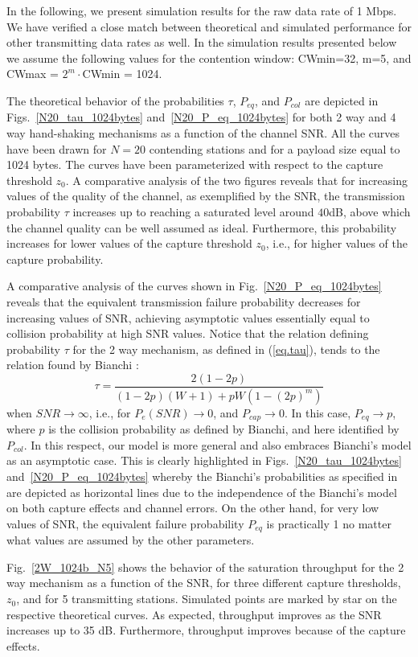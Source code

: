 \documentclass[10pt,onecolumn,a4paper]{IEEEtran}
\begin{document}
In the following, we present simulation results for the raw data
rate of 1 Mbps. We have verified a close match between theoretical
and simulated performance for other transmitting data rates as
well. In the simulation results presented below we assume the
following values for the contention window: CWmin=32, m=5, and
CWmax = $2^m\cdot$CWmin = 1024.

The theoretical behavior of the probabilities $\tau$, $P_{eq}$,
and $P_{col}$ are depicted in Figs.~\ref{N20_tau_1024bytes}
and~\ref{N20_P_eq_1024bytes} for both 2 way and 4 way hand-shaking
mechanisms as a function of the channel SNR. All the curves have
been drawn for $N=20$ contending stations and for a payload size
equal to 1024 bytes. The curves have been parameterized with respect to
the capture threshold $z_0$. A comparative analysis of the two
figures reveals that for increasing values of the quality of the
channel, as exemplified by the SNR, the transmission probability
$\tau$ increases up to reaching a saturated level around $40$dB,
above which the channel quality can be well assumed as ideal.
Furthermore, this probability increases for lower values of the
capture threshold $z_0$, i.e., for higher values of the capture
probability.

A comparative analysis of the curves shown in
Fig.~\ref{N20_P_eq_1024bytes} reveals that the equivalent
transmission failure probability decreases for increasing values
of SNR, achieving asymptotic values essentially equal to collision
probability at high SNR values. Notice that the relation defining
probability $\tau$ for the 2 way mechanism, as defined in
(\ref{eq.tau}), tends to the relation found by Bianchi
\cite{Bianchi}:
\[
\tau=\frac{2(1-2p)}{(1-2p)(W+1)+pW(1-(2p)^m)}
\]
when $SNR\rightarrow\infty$, i.e., for $P_e(SNR)\rightarrow
0$, and $P_{cap}\rightarrow 0$. In this case,
$P_{eq}\rightarrow p$, where $p$ is the collision probability as
defined by Bianchi, and here identified by $P_{col}$. In this
respect, our model is more general and also embraces Bianchi's
model as an asymptotic case. This is clearly highlighted in
Figs.~\ref{N20_tau_1024bytes} and~\ref{N20_P_eq_1024bytes} whereby
the Bianchi's probabilities as specified in \cite{Bianchi} are
depicted as horizontal lines due to the independence of the
Bianchi's model on both capture effects and channel errors. On
the other hand, for very low values of SNR, the equivalent failure
probability $P_{eq}$ is practically 1 no matter what values are
assumed by the other parameters.


Fig.~\ref{2W_1024b_N5} shows the behavior of the saturation
throughput for the 2 way mechanism as a function of the SNR, for
three different capture thresholds, $z_0$, and for 5 transmitting
stations. Simulated points are marked by star on the respective
theoretical curves. As expected, throughput improves as the SNR
increases up to 35 dB. Furthermore, throughput improves because of
the capture effects.
\end{document}
